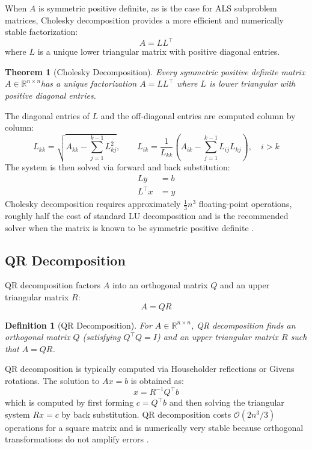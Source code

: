 \documentclass[12pt,a4paper]{report}
\newtheorem{definition}{Definition}[chapter]
\newtheorem{theorem}{Theorem}[chapter]
\begin{document}
When \( A \) is symmetric positive definite, as is the case for ALS subproblem matrices, Cholesky decomposition provides a more efficient and numerically stable factorization:
\[
    A = LL^\top
\]
where \( L \) is a unique lower triangular matrix with positive diagonal entries.

\begin{theorem}[Cholesky Decomposition]
    Every symmetric positive definite matrix \( A \in \mathbb{R}^{n \times n} \)has a unique factorization \( A = LL^\top \) where \( L \) is lower triangular with positive diagonal entries.
\end{theorem}

The diagonal entries of \( L \) and the off-diagonal entries are computed
column by column:
\[
    L_{kk} = \sqrt{A_{kk} - \sum_{j=1}^{k-1} L_{kj}^2}, \qquad
    L_{ik} = \frac{1}{L_{kk}} \left( A_{ik} - \sum_{j=1}^{k-1} L_{ij} L_{kj}
    \right), \quad i > k
\]
The system is then solved via forward and back substitution:
\begin{align*}
    Ly  &= b \\
    L^\top x &= y
\end{align*}
Cholesky decomposition requires approximately \( \frac{1}{3} n^3 \) floating-point operations, roughly half the cost of standard LU decomposition and is the recommended solver when the matrix is known to be symmetric positive definite \parencite{axler2024linear}.

\subsection{QR Decomposition}

QR decomposition factors \( A \) into an orthogonal matrix \( Q \) and an upper triangular matrix \( R \):
\[
    A = QR
\]

\begin{definition}[QR Decomposition]
    For \( A \in \mathbb{R}^{n \times n} \), QR decomposition finds an orthogonal
    matrix \( Q \) (satisfying \( Q^\top Q = I \)) and an upper triangular matrix
    \( R \) such that \( A = QR \).
\end{definition}

QR decomposition is typically computed via Householder reflections or Givens rotations. The solution to \( Ax = b \) is obtained as:
\[
    x = R^{-1} Q^\top b
\]
which is computed by first forming \( c = Q^\top b \) and then solving the triangular system \( Rx = c \) by back substitution. QR decomposition costs \( \mathcal{O}(2n^3/3) \) operations for a square matrix and is numerically very stable because orthogonal transformations do not amplify errors \parencite{axler2024linear}.
\end{document}
